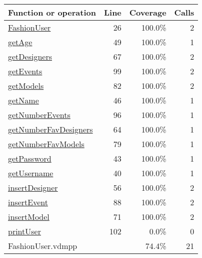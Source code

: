 \begin{longtable}{|l|r|r|r|}
\hline
Function or operation & Line & Coverage & Calls \\
\hline
\hline
\hyperref[FashionUser:26]{FashionUser} & 26&100.0\% & 2 \\
\hline
\hyperref[getAge:49]{getAge} & 49&100.0\% & 1 \\
\hline
\hyperref[getDesigners:67]{getDesigners} & 67&100.0\% & 2 \\
\hline
\hyperref[getEvents:99]{getEvents} & 99&100.0\% & 2 \\
\hline
\hyperref[getModels:82]{getModels} & 82&100.0\% & 2 \\
\hline
\hyperref[getName:46]{getName} & 46&100.0\% & 1 \\
\hline
\hyperref[getNumberEvents:96]{getNumberEvents} & 96&100.0\% & 1 \\
\hline
\hyperref[getNumberFavDesigners:64]{getNumberFavDesigners} & 64&100.0\% & 1 \\
\hline
\hyperref[getNumberFavModels:79]{getNumberFavModels} & 79&100.0\% & 1 \\
\hline
\hyperref[getPassword:43]{getPassword} & 43&100.0\% & 1 \\
\hline
\hyperref[getUsername:40]{getUsername} & 40&100.0\% & 1 \\
\hline
\hyperref[insertDesigner:56]{insertDesigner} & 56&100.0\% & 2 \\
\hline
\hyperref[insertEvent:88]{insertEvent} & 88&100.0\% & 2 \\
\hline
\hyperref[insertModel:71]{insertModel} & 71&100.0\% & 2 \\
\hline
\hyperref[printUser:102]{printUser} & 102&0.0\% & 0 \\
\hline
\hline
FashionUser.vdmpp & & 74.4\% & 21 \\
\hline
\end{longtable}

